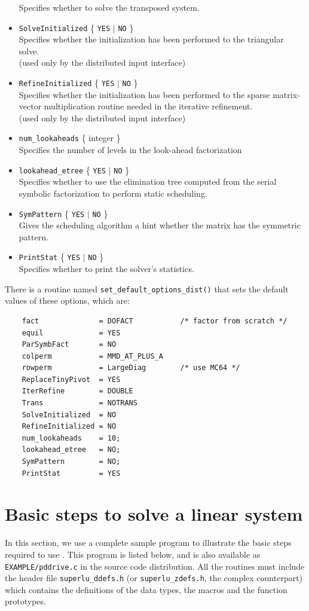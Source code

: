 \begin{itemize}
    Specifies whether to solve the transposed system.
\item {\tt SolveInitialized}  \{ {\tt YES} $|$ {\tt NO} \} \\
    Specifies whether the initialization has been performed to
    the triangular solve. \\
   (used only by the distributed input interface)
\item {\tt RefineInitialized}  \{ {\tt YES} $|$ {\tt NO} \} \\
    Specifies whether the initialization has been performed to
    the sparse matrix-vector multiplication routine needed in the
    iterative refinement. \\
    (used only by the distributed input interface)
\item {\tt num\_lookaheads}  \{ integer \} \\
    Specifies the number of levels in the look-ahead factorization
\item {\tt lookahead\_etree}  \{ {\tt YES} $|$ {\tt NO} \} \\
    Specifies whether to use the elimination tree computed from the 
    serial symbolic factorization to perform static scheduling.
\item {\tt SymPattern}  \{ {\tt YES} $|$ {\tt NO} \} \\
    Gives the scheduling algorithm a hint whether the matrix
    has the symmetric pattern.
 \item {\tt PrintStat}  \{ {\tt YES} $|$ {\tt NO} \} \\
    Specifies whether to print the solver's statistics.
\end{itemize}

There is a routine named {\tt set\_default\_options\_dist()} that sets the
default values of these options, which are:
\begin{verbatim}
    fact              = DOFACT           /* factor from scratch */
    equil             = YES
    ParSymbFact       = NO
    colperm           = MMD_AT_PLUS_A
    rowperm           = LargeDiag        /* use MC64 */
    ReplaceTinyPivot  = YES
    IterRefine        = DOUBLE
    Trans             = NOTRANS
    SolveInitialized  = NO
    RefineInitialized = NO
    num_lookaheads    = 10;
    lookahead_etree   = NO;
    SymPattern        = NO;
    PrintStat         = YES
\end{verbatim}


\section{Basic steps to solve a linear system}
In this section, we use a complete sample program to illustrate
the basic steps required to use {\superlud}.
This program is listed below, and is also available
as {\tt EXAMPLE/pddrive.c} in the source code distribution.
All the routines must include the header file {\tt superlu\_ddefs.h}
(or {\tt superlu\_zdefs.h}, the complex counterpart)
which contains the definitions of the data types, the macros and
the function prototypes.

